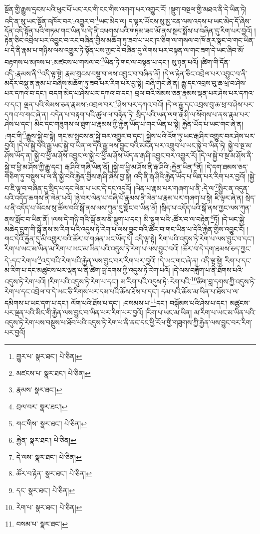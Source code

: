 སྔོན་གྱི་རྒྱུས་དྲངས་པའི་ཕུང་པོ་ཡང་རང་གི་ངང་གིས་འགག་པར་འགྱུར་རོ། །སྡུག་བསྔལ་གྱི་མཐའ་ནི་དེ་ཡིན་ཏེ། འདི་ན་སུ་ཡང་སྔོན་འཁོར་བར་:འགྱུར་བ་\footnote{གྱུར་པ་  སྣར་ཐང་།  པེ་ཅིན། }ཡང་མེད་ལ། ད་ལྟར་ཡོངས་སུ་མྱ་ངན་ལས་འདས་པ་ཡང་མེད་དོ་ཞེས་དོན་འདི་སྟོན་པའི་གཏམ་གང་ཡིན་པ་དེ་ནི་འཕགས་པའི་གཏམ་ཟབ་མོ་ནས་སྔར་སྨོས་པ་བཞིན་དུ་རིག་པར་བྱའོ། །རྟེན་ཅིང་འབྲེལ་པར་འབྱུང་བ་རང་བཞིན་གྱིས་མཆོག་ཏུ་ཟབ་པ་ཡང་ཁ་ཅིག་ལ་གསལ་བ་ཁོ་ནར་སྣང་བ་གང་ཡིན་པ་དེ་ནི་རྣམ་པ་གཉིས་ལས་འགྱུར་ཏེ་སྟོན་པས་ཀྱང་དེ་བཞིན་དུ་ལེགས་པར་བསྟན་ལ་གང་ཟག་དེ་ཡང་ཞིབ་མོ་བརྟགས་པ་མཁས་པ་:མཛངས་པ་གསལ་བ་\footnote{མཛངས་པ་  སྣར་ཐང་།  པེ་ཅིན། }ཡིན་ཏེ་གང་ལ་བསྟན་པ་དང་། སུ་ཉན་པའོ། །ཚིག་གི་དོན་འདི་:རྣམས་ནི་\footnote{རྣམས་  སྣར་ཐང་། }འདི་ལྟ་སྟེ། རྣམ་གྲངས་བསྡུ་བ་ལས་འབྱུང་བ་བཞིན་ནོ། །དེ་ལ་རྟེན་ཅིང་འབྲེལ་པར་འབྱུང་བ་ནི་མདོར་བསྡུ་ན་རྣམ་པ་བཞིས་མཆོག་ཏུ་ཟབ་པར་རིག་པར་བྱ་སྟེ། བཞི་གང་ཞེ་ན། རྒྱུ་དང་འབྲས་བུ་ཆ་ཕྲ་བ་ཤེས་པར་དཀའ་བ་དང་། བདག་མེད་པ་ཤེས་པར་དཀའ་བ་དང་། བྲལ་བའི་སེམས་ཅན་རྣམས་ལྡན་པར་ཤེས་པར་དཀའ་བ་དང་། ལྡན་པའི་སེམས་ཅན་རྣམས་:འབྲལ་བར་\footnote{བྲལ་བར་  སྣར་ཐང་། }ཤེས་པར་དཀའ་བའོ། །དེ་ལ་རྒྱུ་དང་འབྲས་བུ་ཆ་ཕྲ་བ་ཤེས་པར་དཀའ་བ་གང་ཞེ་ན། བདེན་པ་བརྟག་པའི་ཚུལ་ལ་བརྟེན་ཏེ། སྲིད་པའི་ཡན་ལག་རྒ་ཤི་ལ་སོགས་པ་ནས་རྣམ་པར་ཤེས་པ་དང་། མིང་དང་གཟུགས་ལ་ཐུག་པ་རྣམས་ཀྱི་རྐྱེན་ཡོད་པ་གང་ཡིན་པ་སྟེ། རྐྱེན་ཡོད་པ་ཡང་གང་ཞེ་ན། :གང་གི་\footnote{གང་གིས་  སྣར་ཐང་།  པེ་ཅིན། }རྒྱུས་སྐྱེ་བ་སྟེ། གང་མ་སྤངས་ན་སྐྱེ་བར་འགྱུར་བ་དང་། སྐྱེས་པའི་འོག་ཏུ་ཡང་རྒ་ཤིར་འགྱུར་བར་ཤེས་པར་བྱའོ། །དེ་ལ་སྐྱེ་བའི་རྒྱུ་ཡང་སྐྱེ་བ་ཡིན་ལ་དེའི་རྒྱུ་ལས་བྱུང་བའི་མངོན་པར་འགྲུབ་པ་ཡང་སྐྱེ་བ་ཡིན་ཏེ། སྐྱེ་བ་སྔ་མ་ཤོས་ཡོད་ན། སྐྱེ་བ་ཕྱི་མ་ཤོས་འབྱུང་ལ་སྐྱེ་བ་ཕྱི་མ་ཤོས་ཡོད་ན་རྒ་ཤི་འབྱུང་བར་འགྱུར་རོ། །དེ་ལ་སྐྱེ་བ་སྔ་མ་ཤོས་ནི་སྐྱེ་བ་ཕྱི་མ་ཤོས་ཀྱི་རྒྱུ་དང་། རྒ་ཤིའི་གཞི་ཡིན་ནོ། །སྐྱེ་བ་ཕྱི་མ་ཤོས་ནི་རྒ་ཤིའི་:རྐྱེན་ཡིན་\footnote{རྐྱེན་  སྣར་ཐང་།  པེ་ཅིན། }ནོ། །དེ་དག་ཐམས་ཅད་གཅིག་ཏུ་བསྡུས་པ་ལ་ནི་སྐྱེ་བའི་རྐྱེན་གྱིས་རྒ་ཤི་ཞེས་བྱ་སྟེ། འདི་ནི་རྒ་ཤིའི་རྐྱེན་ཡོད་པ་ཡིན་པར་རིག་པར་བྱའོ། །སྐྱེ་བ་ཇི་ལྟ་བ་བཞིན་དུ་སྲིད་པ་དང་ལེན་པ་ཡང་དེ་དང་འདྲའོ། །ལེན་པ་རྣམ་པར་གཞག་པ་ནི་:དེ་ལ་\footnote{དེ་ལས་  སྣར་ཐང་།  པེ་ཅིན། }སྤྱིར་ན་འདུན་པའི་འདོད་ཆགས་ནི་ལེན་པའོ། །ཉེ་བར་ལེན་པ་བཞི་པོ་རྣམས་ནི་ལེན་པ་རྣམ་པར་གཞག་པ་སྟེ། ཇི་ལྟར་ཞེ་ན། སྲེད་པ་ནི་འདོད་པ་ཡོངས་སུ་ཚོལ་བའི་སྒོ་ནས་ལས་ཀུན་དུ་སློང་བ་ཡིན་ནོ། །སྲིད་པ་འདོད་པའི་སྒོ་ནས་ཀྱང་ལས་ཀུན་ནས་སློང་བ་ཡིན་ནོ། །ལས་དེ་གཉི་གའི་སྒོ་ནས་ནི་སྡུག་པ་དང་། མི་སྡུག་པའི་:ཚོར་བ་ལ་བརྟེན་\footnote{ཚོར་བ་རྟེན་  སྣར་ཐང་།  པེ་ཅིན། }ཏོ། །དེ་ཡང་སྐྱེ་མཆེད་དྲུག་གི་སྒོ་ནས་མ་རིག་པའི་འདུས་ཏེ་རེག་པ་ལས་བྱུང་བའི་ཚོར་བ་གང་ཡིན་པ་དེའི་རྐྱེན་གྱིས་འབྱུང་ངོ། །གང་དེའི་རྐྱེན་དུ་མི་འགྱུར་བའི་ཚོར་བ་གཞན་ཡང་ཡོད་དེ། འདི་ལྟ་སྟེ། རིག་པའི་འདུས་ཏེ་རེག་པ་ལས་བྱུང་བ་དང་། རིག་པ་ཡང་མ་ཡིན་མ་རིག་པ་ཡང་མ་ཡིན་པའི་འདུས་ཏེ་རེག་པ་ལས་བྱུང་བའོ། །ཚོར་བ་དེ་དག་ཐམས་ཅད་ཀྱང་དེ་:དང་རེག་པ་\footnote{དང་  སྣར་ཐང་།  པེ་ཅིན། }འདྲ་བའི་རེག་པའི་རྐྱེན་ལས་བྱུང་བར་རིག་པར་བྱའོ། །དེ་ཡང་གང་ཞེ་ན། འདི་ལྟ་སྟེ། རིག་པ་དང་མ་རིག་པ་དང་མཚུངས་པར་ལྡན་པ་ནི་ཚིག་བླ་དགས་ཀྱི་འདུས་ཏེ་རེག་པའོ། །དེ་ལས་བཟློག་པ་ནི་ཐོགས་པའི་འདུས་ཏེ་རེག་པའོ། །རིག་པའི་འདུས་ཏེ་རེག་པ་དང་། མ་རིག་པའི་འདུས་ཏེ་:རེག་པའི་\footnote{རེག་པ་  སྣར་ཐང་།  པེ་ཅིན། }ཚིག་བླ་དགས་ཀྱི་འདུས་ཏེ་རེག་པ་དང་འབྲེལ་བ་དེ་ཡང་ཅི་རིགས་པར་དམ་པའི་ཆོས་ཐོས་པ་དང་། དམ་པའི་ཆོས་མ་ཡིན་པ་ཐོས་པ་ལ་དམིགས་པ་ཡང་དག་པ་དང་། ལོག་པའི་ཐོས་པ་དང་། :བསམས་པ་\footnote{བསམ་པ་  སྣར་ཐང་། }དང་། བསྒོམས་པའི་ཤེས་པ་དང་། མཚུངས་པར་ལྡན་པའི་མིང་གི་རྐྱེན་ལས་བྱུང་བ་ཡིན་པར་རིག་པར་བྱའོ། །རིག་པ་ཡང་མ་ཡིན། མ་རིག་པ་ཡང་མ་ཡིན་པའི་འདུས་ཏེ་རེག་པས་བསྡུས་པ་ཐོབ་པའི་འདུས་ཏེ་རེག་པ་ནི་ནང་དང་ཕྱི་རོལ་གྱི་གཟུགས་ཀྱི་རྐྱེན་ལས་བྱུང་བར་རིག་པར་བྱའོ། 